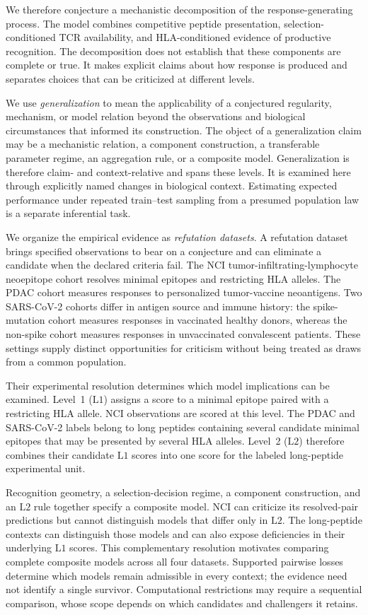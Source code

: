 \documentclass[11pt]{article}
\begin{document}
We therefore conjecture a mechanistic decomposition of the response-generating
process. The model combines competitive peptide presentation,
selection-conditioned TCR availability, and HLA-conditioned evidence of
productive recognition. The decomposition does not establish that these
components are complete or true. It makes explicit claims about how response
is produced and separates choices that can be criticized at different levels.

We use \emph{generalization} to mean the applicability of a conjectured
regularity, mechanism, or model relation beyond the observations and biological
circumstances that informed its construction. The object of a generalization
claim may be a mechanistic relation, a component construction, a transferable
parameter regime, an aggregation rule, or a composite model. Generalization is
therefore claim- and context-relative and spans these levels. It is examined
here through explicitly named changes in biological context. Estimating
expected performance under repeated train--test sampling from a presumed
population law is a separate inferential task.

We organize the empirical evidence as \emph{refutation datasets}. A refutation
dataset brings specified observations to bear on a conjecture and can eliminate
a candidate when the declared criteria fail. The NCI
tumor-infiltrating-lymphocyte neoepitope cohort resolves minimal epitopes and
restricting HLA alleles. The PDAC cohort measures responses to personalized
tumor-vaccine neoantigens. Two SARS-CoV-2 cohorts differ in antigen source and
immune history: the spike-mutation cohort measures responses in vaccinated
healthy donors, whereas the non-spike cohort measures responses in unvaccinated
convalescent patients. These settings supply distinct opportunities for
criticism without being treated as draws from a common population.

Their experimental resolution determines which model implications can be
examined. Level~1 (\(\mathrm{L1}\)) assigns a score to a minimal epitope paired
with a restricting HLA allele. NCI observations are scored at this level. The
PDAC and SARS-CoV-2 labels belong to long peptides containing several candidate
minimal epitopes that may be presented by several HLA alleles. Level~2
(\(\mathrm{L2}\)) therefore combines their candidate \(\mathrm{L1}\) scores into
one score for the labeled long-peptide experimental unit.

Recognition geometry, a selection-decision regime, a component construction,
and an \(\mathrm{L2}\) rule together specify a composite model. NCI can
criticize its resolved-pair predictions but cannot distinguish models that
differ only in \(\mathrm{L2}\). The long-peptide contexts can distinguish those
models and can also expose deficiencies in their underlying \(\mathrm{L1}\)
scores. This complementary resolution motivates comparing complete composite
models across all four datasets. Supported pairwise losses determine which
models remain admissible in every context; the evidence need not identify a
single survivor. Computational restrictions may require a sequential
comparison, whose scope depends on which candidates and challengers it retains.
\end{document}
